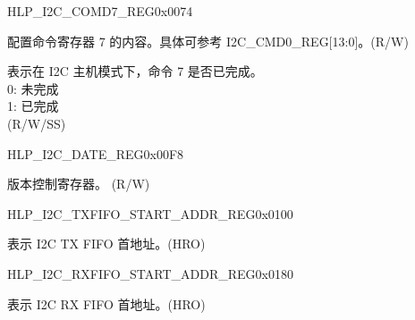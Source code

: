 \begin{register}{H}{LP\_I2C\_COMD7\_REG}{0x0074}\label{regdesc:LPI2CCOMD7REG}
%
%
%
\regnewline%
\begin{regdesc}\begin{reglist}
\label{fielddesc:LPI2CCOMMAND7}\item [LP\_I2C\_COMMAND7] 配置命令寄存器 7 的内容。具体可参考 I2C\_CMD0\_REG[13:0]。(R/W)
\label{fielddesc:LPI2CCOMMAND7DONE}\item [LP\_I2C\_COMMAND7\_DONE] 表示在 I2C 主机模式下，命令 7 是否已完成。\\
0: 未完成\\
1: 已完成 \\ (R/W/SS)
\end{reglist}\end{regdesc}
\end{register}


\begin{register}{H}{LP\_I2C\_DATE\_REG}{0x00F8}\label{regdesc:LPI2CDATEREG}
%
\regnewline%
\begin{regdesc}\begin{reglist}
\label{fielddesc:LPI2CDATE}\item [LP\_I2C\_DATE] 版本控制寄存器。 (R/W)
\end{reglist}\end{regdesc}
\end{register}


\begin{register}{H}{LP\_I2C\_TXFIFO\_START\_ADDR\_REG}{0x0100}\label{regdesc:LPI2CTXFIFOSTARTADDRREG}
%
\regnewline%
\begin{regdesc}\begin{reglist}
\label{fielddesc:LPI2CTXFIFOSTARTADDR}\item [LP\_I2C\_TXFIFO\_START\_ADDR] 表示 I2C TX FIFO 首地址。(HRO)
\end{reglist}\end{regdesc}
\end{register}


\begin{register}{H}{LP\_I2C\_RXFIFO\_START\_ADDR\_REG}{0x0180}\label{regdesc:LPI2CRXFIFOSTARTADDRREG}
%
\regnewline%
\begin{regdesc}\begin{reglist}
\label{fielddesc:LPI2CRXFIFOSTARTADDR}\item [LP\_I2C\_RXFIFO\_START\_ADDR] 表示 I2C RX FIFO 首地址。(HRO)
\end{reglist}\end{regdesc}
\end{register}

